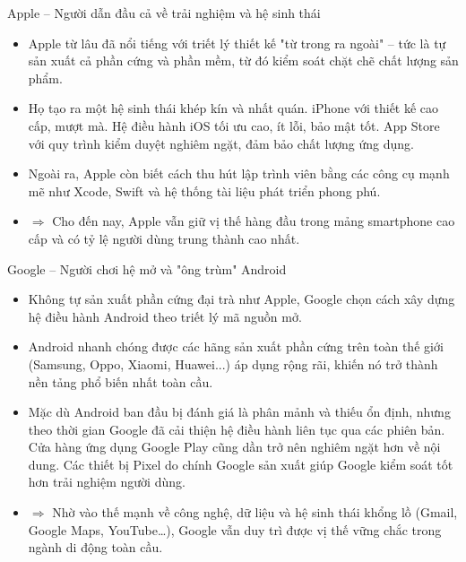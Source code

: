     \begin{flushleft}
      \hspace*{0.8cm}Apple – Người dẫn đầu cả về trải nghiệm và hệ sinh thái
      \setlength{\leftmargini}{1.5cm}
      \begin{itemize}
          \item Apple từ lâu đã nổi tiếng với triết lý thiết kế "từ trong ra ngoài" – tức là tự sản xuất cả phần cứng và phần mềm, từ đó kiểm soát chặt chẽ chất lượng sản phẩm.
          \item Họ tạo ra một hệ sinh thái khép kín và nhất quán. iPhone với thiết kế cao cấp, mượt mà. Hệ điều hành iOS tối ưu cao, ít lỗi, bảo mật tốt. App Store với quy trình kiểm duyệt nghiêm ngặt, đảm bảo chất lượng ứng dụng.
          \item Ngoài ra, Apple còn biết cách thu hút lập trình viên bằng các công cụ mạnh mẽ như Xcode, Swift và hệ thống tài liệu phát triển phong phú.
          \item[]$\Rightarrow$ Cho đến nay, Apple vẫn giữ vị thế hàng đầu trong mảng smartphone cao cấp và có tỷ lệ người dùng trung thành cao nhất.
      \end{itemize}
    \end{flushleft}

    \begin{flushleft}
      \hspace*{0.8cm}Google – Người chơi hệ mở và "ông trùm" Android
      \setlength{\leftmargini}{1.5cm}
      \begin{itemize}
          \item Không tự sản xuất phần cứng đại trà như Apple, Google chọn cách xây dựng hệ điều hành Android theo triết lý mã nguồn mở.
          \item Android nhanh chóng được các hãng sản xuất phần cứng trên toàn thế giới (Samsung, Oppo, Xiaomi, Huawei...) áp dụng rộng rãi, khiến nó trở thành nền tảng phổ biến nhất toàn cầu.
          \item Mặc dù Android ban đầu bị đánh giá là phân mảnh và thiếu ổn định, nhưng theo thời gian Google đã cải thiện hệ điều hành liên tục qua các phiên bản. Cửa hàng ứng dụng Google Play cũng dần trở nên nghiêm ngặt hơn về nội dung. Các thiết bị Pixel do chính Google sản xuất giúp Google kiểm soát tốt hơn trải nghiệm người dùng.
          \item[]$\Rightarrow$ Nhờ vào thế mạnh về công nghệ, dữ liệu và hệ sinh thái khổng lồ (Gmail, Google Maps, YouTube…), Google vẫn duy trì được vị thế vững chắc trong ngành di động toàn cầu.
      \end{itemize}
    \end{flushleft}

